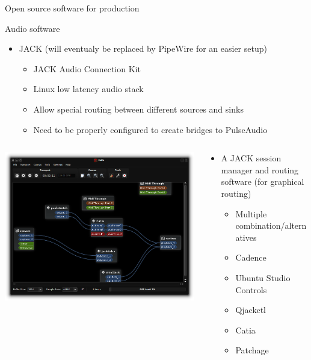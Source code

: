 \begin{frame}{Open source software for production}

    Audio software
    \begin{itemize}
        \item JACK (will eventualy be replaced by PipeWire for an easier setup)
        \begin{itemize}
            \item JACK Audio Connection Kit
            \item Linux low latency audio stack
            \item Allow special routing between different sources and sinks
            \item Need to be properly configured to create bridges to PulseAudio
        \end{itemize}
    \end{itemize}

\begin{columns}

    \begin{column}{0.4\linewidth}
        \includegraphics[width=\linewidth]{catia.png}
    \end{column}

    \begin{column}{0.6\linewidth}
        \begin{itemize}
            \item A JACK session manager and routing software (for graphical routing)
            \begin{itemize}
                \item Multiple combination/alternatives
                \item Cadence
                \item Ubuntu Studio Controls
                \item Qjackctl
                \item Catia
                \item Patchage
            \end{itemize}
        \end{itemize}
    \end{column}
    

\end{columns}
\end{frame}
